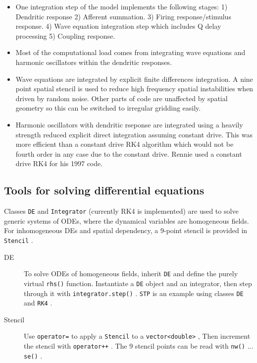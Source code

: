 \documentclass[12pt,a4paper]{article}
\newcommand{\type}[1]{ {\small\small\tt #1} }
\begin{document}
\begin{itemize}
\item One integration step of the model implements the following stages: 1) Dendritic response 2) Afferent summation. 3) Firing response/stimulus response. 4) Wave equation integration step which includes Q delay processing 5) Coupling response.
\item Most of the computational load comes from integrating wave equations and harmonic oscillators within the dendritic responses.
\item Wave equations are integrated by explicit finite differences integration. A nine point spatial stencil is used to reduce high frequency spatial instabilities when driven by random noise. Other parts of code are unaffected by spatial geometry so this can be switched to irregular gridding easily.
\item Harmonic oscillators with dendritic rseponse are integrated using a heavily strength reduced explicit direct integration assuming constant drive. This was more efficient than a constant drive RK4 algorithm which would not be fourth order in any case due to the constant drive. Rennie used a constant drive RK4 for his 1997 code.
\end{itemize}

\subsection{Tools for solving differential equations}

Classes \type{DE} and \type{Integrator} (currently RK4 is implemented) are used to solve generic systems of ODEs, where the dynamical variables are homogeneous fields. For inhomogeneous DEs and spatial dependency, a 9-point stencil is provided in \type{Stencil}.

\begin{description}
	\item[DE] To solve ODEs of homogeneous fields, inherit \type{DE} and define the purely virtual \type{rhs()} function. Instantiate a \type{DE} object and an integrator, then step through it with \type{integrator.step()}. \type{STP} is an example using classes \type{DE} and \type{RK4}.
	\item[Stencil] Use \type{operator=} to apply a \type{Stencil} to a \type{vector<double>}, Then increment the stencil with \type{operator++}. The 9 stencil points can be read with \type{nw()} ... \type{se()}.
\end{description}
\end{document}

